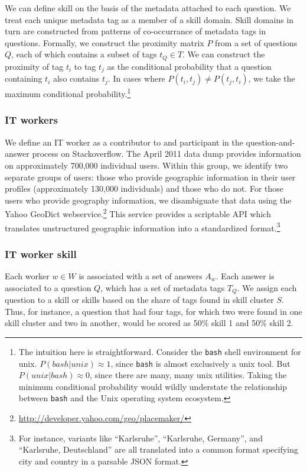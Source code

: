 \documentclass[11pt]{article}
\begin{document}
We can define skill on the basis of the metadata attached to each
question. We treat each unique metadata tag as a member of a skill
domain. Skill domains in turn are constructed from patterns of
co-occurrance of metadata tags in questions. Formally, we construct
the proximity matrix $P$ from a set of questions $Q$, each of which
contains a subset of tags $t_Q \in T$. We can construct the proximity
of tag $t_i$ to tag $t_j$ as the conditional probability that a
question containing $t_i$ also contains $t_j$. In cases where $P(t_i,
t_j) \neq P(t_j, t_i)$, we take the maximum conditional
probability.\footnote{The intuition here is straightforward. Consider
  the \texttt{bash} shell environment for unix. $P(bash | unix)
  \approx 1$, since \texttt{bash} is almost exclusively a unix
  tool. But $P(unix | bash) \approx 0$, since there are many, many
  unix utilities. Taking the minimum conditional probability would
  wildly understate the relationship between \texttt{bash} and the
  Unix operating system ecosystem.}

\subsubsection{IT workers}
\label{sec:it-workers}

We define an IT worker as a contributor to and participant in the
question-and-answer process on Stackoverflow. The April 2011 data dump
provides information on approximately 700,000 individual users. Within
this group, we identify two separate
groups of users: those who provide geographic information in their
user profiles (approximately 130,000 individuals) and those who do
not. For those users who provide geography information, we
disambiguate that data using the Yahoo GeoDict webservice.\footnote{\url{http://developer.yahoo.com/geo/placemaker/}} This
service provides a scriptable API which translates unstructured
geographic information into a standardized format.\footnote{For
  instance, variants like ``Karlsruhe'', ``Karlsruhe, Germany'', and
  ``Karlsruhe, Deutschland'' are all translated into a common format
  specifying city and country in a parsable JSON format.}

\subsubsection{IT worker skill}
\label{sec:it-worker-skill}

Each worker $w \in W$ is associated with a set of answers $A_w$. Each
answer is associated to a question $Q$, which has a set of metadata
tags $T_Q$. We assign each question to a skill or skills based on the
share of tags found in skill cluster $S$. Thus, for instance, a
question that had four tags, for which two were found in one skill
cluster and two in another, would be scored as 50\% skill 1 and 50\%
skill 2.  
\end{document}
